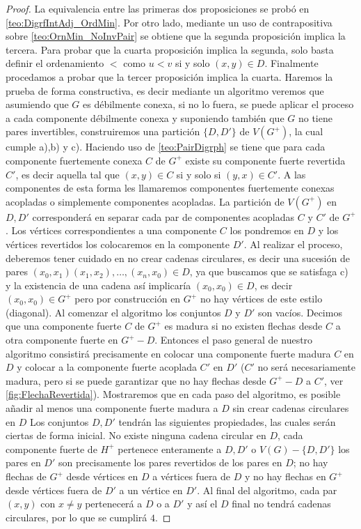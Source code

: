 \begin{proof}
  La equivalencia entre las primeras dos proposiciones se prob\'o en \cref{teo:DigrfIntAdj_OrdMin}.
  Por otro lado, mediante un uso de contrapositiva sobre \cref{teo:OrnMin_NoInvPair} se obtiene que la segunda proposici\'on implica la tercera. 
  {\color{malva}Para probar que la cuarta proposici\'on implica la segunda, solo basta definir el ordenamiento $<$ como $u<v$ si y solo $(x,y) \in D$. }
  Finalmente procedamos a probar que la tercer proposici\'on implica la cuarta. Haremos la prueba de forma constructiva, es decir mediante un algoritmo veremos que asumiendo que $G$ es d\'ebilmente conexa, si no lo fuera, se puede aplicar el proceso a cada componente d\'ebilmente conexa y  suponiendo tambi\'en que $G$ no tiene pares invertibles, construiremos una partici\'on $\{D,D'\}$ de $V(G^+)$, la cual cumple a),b) y c). 
  Haciendo uso de \cref{teo:PairDigrph} se tiene que para cada componente fuertemente conexa $C$ de $G^+$ existe su componente fuerte revertida $C'$, es decir aquella tal que $(x,y)\in C $ si y solo si $(y,x)\in C'$. A las componentes de esta forma les llamaremos componentes fuertemente conexas acopladas o simplemente componentes acopladas.
  La partici\'on de $V(G^+)$ en $D,D'$ corresponder\'a en separar cada par de componentes acopladas $C$ y $C'$ de $G^+$. Los v\'ertices correspondientes a una componente $C$ los pondremos en $D$ y los v\'ertices revertidos los colocaremos en la componente $D'$. Al realizar el proceso, deberemos tener cuidado en no crear cadenas circulares, es decir una sucesi\'on de pares $(x_0,x_1)(x_1,x_2),\dots, (x_n,x_0)\in D$, ya que buscamos que se satisfaga c) y la existencia de una cadena así implicaría $(x_0,x_0)\in D$, es decir $(x_0,x_0)\in G^+$ pero por construcci\'on en $G^+$ no hay v\'ertices de este estilo (diagonal). 
  Al comenzar el algoritmo los conjuntos $D$ y $D'$ son vacíos. Decimos que una componente fuerte $C$ de $G^+$ es madura si no existen flechas desde $C$ a otra componente fuerte en $G^+ -D$. Entonces el paso general de nuestro algoritmo consistir\'a precisamente en colocar una componente fuerte madura $C$ en $D$ y colocar a la componente fuerte acoplada $C' $ en $D'$ ($C'$ no ser\'a necesariamente madura, pero si se puede garantizar que no hay flechas desde $G^+ -D$ a $C'$, ver \cref{fig:FlechaRevertida}). 
  Mostraremos que en cada paso del algoritmo, es posible añadir al menos una componente fuerte madura a $D$ sin crear cadenas circulares en $D$
  Los conjuntos $D,D'$ tendr\'an las siguientes propiedades, las cuales ser\'an ciertas de forma inicial. No existe ninguna cadena circular en $D$, cada componente fuerte de $H^+$ pertenece enteramente a $D, D'$ o $V(G)-\{D,D' \} $ los pares en $D'$ son precisamente los pares revertidos de los pares en $D$; no hay flechas de $G^+$ desde v\'ertices en $D$ a v\'ertices fuera de $D$ y no hay flechas en $G^+$ desde v\'ertices fuera de $D'$ a un v\'ertice en $D'$. Al final del algoritmo, cada par $(x,y)$ con $x\neq y$ pertenecer\'a a $D$ o a $D'$ y así el $D$ final no tendr\'a cadenas circulares, por lo que se cumplir\'a $4$.

\end{proof}
